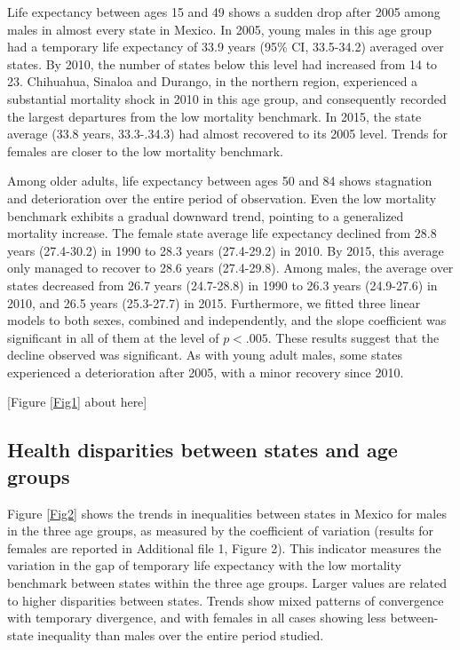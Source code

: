 \documentclass{bmcart}
\begin{document}
Life expectancy between ages 15 and 49 shows a sudden drop after 2005 among males in almost every state in Mexico. In 2005, young males in this age group had a temporary life expectancy of 33.9 years (95\% CI, 33.5-34.2) averaged over states. By 2010, the number of states below this level had increased from 14 to 23. Chihuahua, Sinaloa and Durango, in the northern region, experienced a substantial mortality shock in 2010 in this age group, and consequently recorded the largest departures from the low mortality benchmark. In 2015, the state average (33.8 years, 33.3-.34.3) had almost recovered to its 2005 level.
Trends for females are closer to the low mortality benchmark.

Among older adults, life expectancy between ages 50 and 84 shows stagnation and deterioration over the entire period of observation. Even the low mortality benchmark exhibits a gradual downward trend, pointing to a generalized mortality increase. The female state average life expectancy declined from 28.8 years (27.4-30.2) in 1990 to 28.3 years (27.4-29.2) in 2010. By 2015, this average only managed to recover to 28.6 years (27.4-29.8). Among males, the average over states decreased from 26.7 years (24.7-28.8) in 1990 to 26.3 years (24.9-27.6) in 2010, and 26.5 years (25.3-27.7) in 2015. Furthermore, we fitted three linear models to both sexes, combined and independently, and the slope coefficient was significant in all of them at the level of $p<.005$. These results suggest that the decline observed was significant. As with young adult males, some states experienced a deterioration after 2005, with a minor recovery since 2010.\\

\begin{center}
[Figure \ref{Fig1} about here]
\end{center}

\subsection*{Health disparities between states and age groups}
Figure \ref{Fig2} shows the trends in inequalities between states in Mexico for males in the three age groups, as measured by the coefficient of variation (results for females are reported in Additional file 1, Figure 2). This indicator measures the variation in the gap of temporary life expectancy with the low mortality benchmark between states within the three age groups. Larger values are related to higher disparities between states. Trends show mixed patterns of convergence with temporary divergence, and with females in all cases showing less between-state inequality than males over the entire period studied. 
\end{document}
